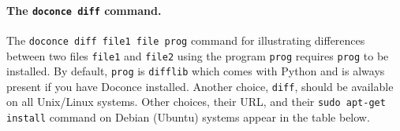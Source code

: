 \documentclass[%
oneside,                 %
final,                   %
10pt]{article}
\begin{document}
\paragraph{The {\fontsize{10pt}{10pt}\protect\Verb!doconce diff!} command.}
The {\fontsize{10pt}{10pt}\Verb!doconce diff file1 file prog!} command for illustrating differences between
two files {\fontsize{10pt}{10pt}\Verb!file1!} and {\fontsize{10pt}{10pt}\Verb!file2!} using the program {\fontsize{10pt}{10pt}\Verb!prog!} requires {\fontsize{10pt}{10pt}\Verb!prog!}
to be installed. By default, {\fontsize{10pt}{10pt}\Verb!prog!} is {\fontsize{10pt}{10pt}\Verb!difflib!} which comes with Python
and is always present if you have Doconce installed. Another choice, {\fontsize{10pt}{10pt}\Verb!diff!},
should be available on all Unix/Linux systems. Other choices, their
URL, and their {\fontsize{10pt}{10pt}\Verb!sudo apt-get install!} command on Debian (Ubuntu) systems
appear in the table below.
\end{document}
